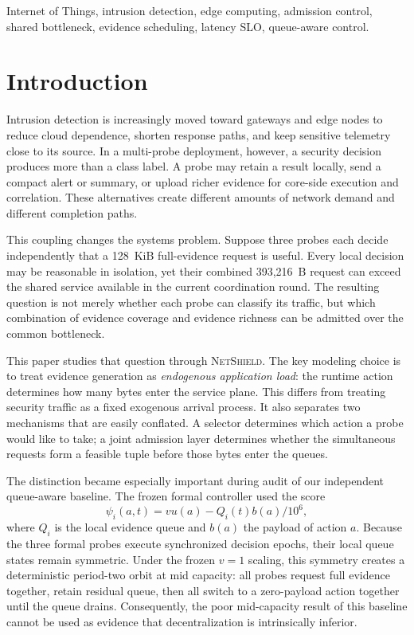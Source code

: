 \documentclass[10pt,journal]{IEEEtran}
\newcommand{\NetShield}{\textsc{NetShield}}
\begin{document}
\begin{IEEEkeywords}
Internet of Things, intrusion detection, edge computing, admission control,
shared bottleneck, evidence scheduling, latency SLO, queue-aware control.
\end{IEEEkeywords}

\section{Introduction}
\label{sec:introduction}

Intrusion detection is increasingly moved toward gateways and edge nodes
to reduce cloud dependence, shorten response paths, and keep sensitive
telemetry close to its source. In a multi-probe deployment, however,
a security decision produces more than a class label. A probe may retain
a result locally, send a compact alert or summary, or upload richer
evidence for core-side execution and correlation. These alternatives
create different amounts of network demand and different completion
paths.

This coupling changes the systems problem. Suppose three probes each
decide independently that a 128~KiB full-evidence request is useful.
Every local decision may be reasonable in isolation, yet their combined
393,216~B request can exceed the shared service available in the current
coordination round. The resulting question is not merely whether each
probe can classify its traffic, but which combination of evidence
coverage and evidence richness can be admitted over the common
bottleneck.

This paper studies that question through \NetShield{}. The key modeling
choice is to treat evidence generation as \emph{endogenous application
load}: the runtime action determines how many bytes enter the service
plane. This differs from treating security traffic as a fixed exogenous
arrival process. It also separates two mechanisms that are easily
conflated. A selector determines which action a probe would like to take;
a joint admission layer determines whether the simultaneous requests
form a feasible tuple before those bytes enter the queues.

The distinction became especially important during audit of our
independent queue-aware baseline. The frozen formal controller used the
score
\begin{equation}
\psi_i(a,t)
=
v u(a)-Q_i(t)b(a)/10^6,
\label{eq:qpg}
\end{equation}
where $Q_i$ is the local evidence queue and $b(a)$ the payload of action
$a$. Because the three formal probes execute synchronized decision
epochs, their local queue states remain symmetric. Under the frozen
$v=1$ scaling, this symmetry creates a deterministic period-two orbit at
mid capacity: all probes request full evidence together, retain residual
queue, then all switch to a zero-payload action together until the queue
drains. Consequently, the poor mid-capacity result of this baseline
cannot be used as evidence that decentralization is intrinsically
inferior.
\end{document}

